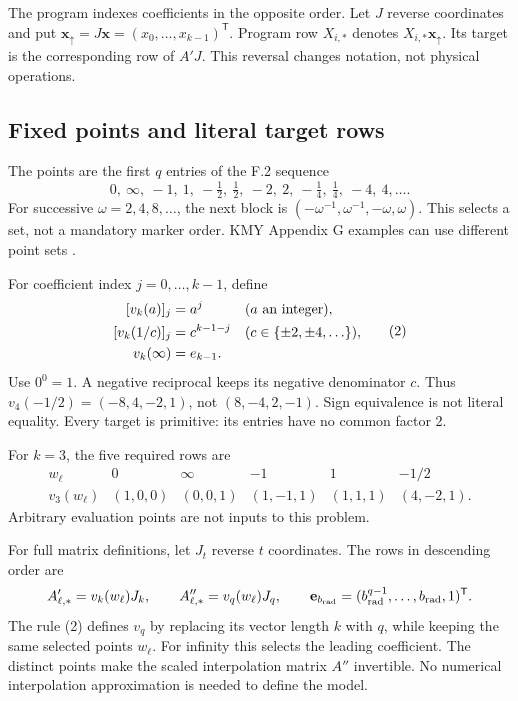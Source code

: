 \documentclass[11pt,letterpaper]{article}
\begin{document}
The program indexes coefficients in the opposite order. Let \(J\)
reverse coordinates and put
\(\mathbf x_\uparrow=J\mathbf x=(x_0,\ldots,x_{k-1})^{\mathsf T}\).
Program row \(X_{i,*}\) denotes \(X_{i,*}\mathbf x_\uparrow\).
Its target is the corresponding row of \(A'J\).
This reversal changes notation, not physical operations.

\subsection{Fixed points and literal target rows}
The points are the first \(q\) entries of the F.2 sequence
\[
0,\ \infty,\ -1,\ 1,\ -\tfrac12,\ \tfrac12,\ -2,\ 2,\
-\tfrac14,\ \tfrac14,\ -4,\ 4,\ldots .
\tag{1}
\]
For successive \(\omega=2,4,8,\ldots\), the next block is
\((-\omega^{-1},\omega^{-1},-\omega,\omega)\).
This selects a set, not a mandatory marker order.
KMY Appendix G examples can use different point sets
\cite[App.~F.2 and G]{kmy}.

For coefficient index \(j=0,\ldots,k-1\), define
\[
\begin{aligned}\relax
[v_k(a)]_j&=a^j &&(a\text{ an integer}),\\
[v_k(1/c)]_j&=c^{k-1-j}
 &&(c\in\{\pm2,\pm4,\ldots\}),\\
v_k(\infty)&=e_{k-1}.
\end{aligned}\tag{2}
\]
Use \(0^0=1\). A negative reciprocal keeps its negative denominator
\(c\). Thus \(v_4(-1/2)=(-8,4,-2,1)\), not \((8,-4,2,-1)\).
Sign equivalence is not literal equality. Every target is primitive:
its entries have no common factor 2.

For \(k=3\), the five required rows are
\[
\begin{array}{c|ccccc}
w_\ell&0&\infty&-1&1&-1/2\\ \hline
v_3(w_\ell)&(1,0,0)&(0,0,1)&(1,-1,1)&(1,1,1)&(4,-2,1).
\end{array}
\]
Arbitrary evaluation points are not inputs to this problem.

For full matrix definitions, let \(J_t\) reverse \(t\) coordinates.
The rows in descending order are
\[
 A'_{\ell,*}=v_k(w_\ell)J_k,\qquad
 A''_{\ell,*}=v_q(w_\ell)J_q,\qquad
 \mathbf e_{b_{\rm rad}}=(b_{\rm rad}^{q-1},\ldots,b_{\rm rad},1)^{\mathsf T}.
\]
The rule (2) defines \(v_q\) by replacing its vector length \(k\) with
\(q\), while keeping the same selected points \(w_\ell\).
For infinity this selects the leading coefficient.
The distinct points make the scaled interpolation matrix \(A''\)
invertible. No numerical interpolation approximation is needed to
define the model.
\end{document}
